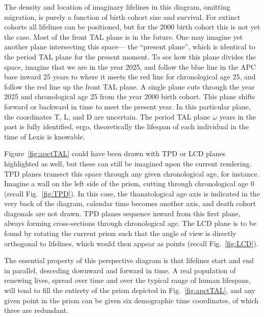 \documentclass[12pt,oneside,a4paper]{article} %
\theoremstyle{definition}
\begin{document}
The density and location of imaginary lifelines in this diagram, omitting
migration, is purely a function of birth cohort size and survival. For extinct
cohorts all lifelines can be positioned, but for the 2000 birth cohort this is
not yet the case. Most of the front TAL plane is in the future. One may imagine
yet another plane intersecting this space--- the ``present plane'', which is
identical to the period TAL plane for the present moment. To see how this plane
divides the space, imagine that we are in the year 2025, and follow the blue
line in the APC base inward 25 years to where it meets the red line for chronological age 25, and follow the
red line up the front TAL plane. A single plane cuts through the year
2025 and chronological age 25 from the year 2000 birth cohort. This plane
shifts forward or backward in time to meet the present year. In this particular
plane, the coordinates T, L, and D are uncertain. The period TAL plane $\omega$
years in the past is fully identified, ergo, theoretically the lifespan of each
individual in the time of Lexis is knowable. 

Figure~\ref{fig:apctTAL} could have been drawn with TPD or LCD planes highlighted
as well, but these can still be imagined upon the current rendering. TPD planes
transect this space through any given chronological age, for instance. Imagine a
wall on the left side of the prism, cutting through chronological age 0 (recall
Fig.~\ref{fig:TPD}).
In this case, the thanatological age axis is indicated in the very back of the diagram,
calendar time becomes another axis, and death cohort diagonals are not drawn.
TPD planes sequence inward from this first plane, always forming cross-sections
through chronological age. The LCD plane is to be found by rotating the current
prism such that the angle of view is directly orthogonal to lifelines, which
would then appear as points (recall Fig.~\ref{fig:LCD}).

The essential property of this perspective diagram is that lifelines
start and end in parallel, desceding downward and forward in time. A real
population of renewing lives, spread over time and over the typical range of
human lifespans, will tend to fill the entirety of the prism depicted in
Fig.~\ref{fig:apctTAL}, and any given point in the prism can be given six
demographic time coordinates, of which three are redundant.

\FloatBarrier
\end{document}
